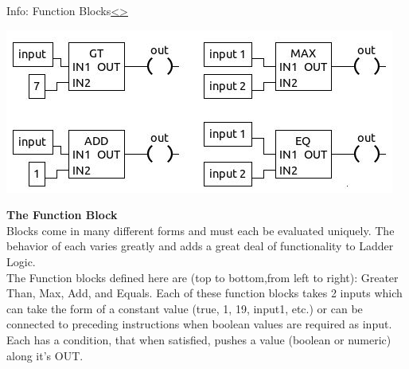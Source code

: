 \documentclass[12pt]{extarticle}
\newenvironment{instructionblock}{\Large\bgroup}{\egroup}
\newcounter{next}
\newcounter{prev}
\begin{document}
\pagebreak
{}
\begin{slide}{Info: Function Blocks}{\hyperref[slide \theprev]{\textless}\hyperref[slide \thenext]{\textgreater}}
	\begin{instructionblock}
		\begin{center}
			\includegraphics[scale=1.2]{Images/FunctionBlock01.JPG}
		\end{center}
	\end{instructionblock}
\end{slide}
\vfill
\noindent
\textbf{The Function Block}\\
Blocks come in many different forms and must each be evaluated uniquely. The behavior of each varies greatly and adds a great deal of functionality to Ladder Logic. \\
The Function blocks defined here are (top to bottom,from left to right): Greater Than, Max, Add, and Equals. Each of these function blocks takes 2 inputs which can take the form of a constant value (true, 1, 19, input1, etc.) or can be connected to preceding instructions when boolean values are required as input. Each has a condition, that when satisfied, pushes a value (boolean or numeric) along it's OUT.
\end{document}
